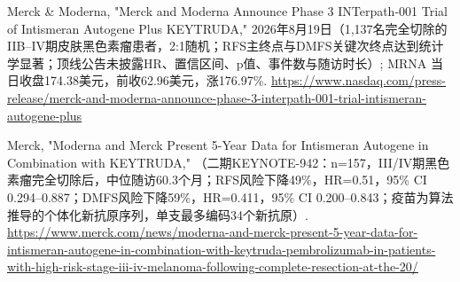 \documentclass[11pt,a4paper]{ctexart}
\begin{document}
\noindent [140] Merck \& Moderna, "Merck and Moderna Announce Phase 3 INTerpath-001 Trial of Intismeran Autogene Plus KEYTRUDA," 2026年8月19日（1,137名完全切除的IIB–IV期皮肤黑色素瘤患者，2:1随机；RFS主终点与DMFS关键次终点达到统计学显著；顶线公告未披露HR、置信区间、p值、事件数与随访时长）; MRNA 当日收盘174.38美元，前收62.96美元，涨176.97\%. \url{https://www.nasdaq.com/press-release/merck-and-moderna-announce-phase-3-interpath-001-trial-intismeran-autogene-plus}

\noindent [141] Merck, "Moderna and Merck Present 5-Year Data for Intismeran Autogene in Combination with KEYTRUDA," （二期KEYNOTE-942：n=157，III/IV期黑色素瘤完全切除后，中位随访60.3个月；RFS风险下降49\%，HR=0.51，95\% CI 0.294–0.887；DMFS风险下降59\%，HR=0.411，95\% CI 0.200–0.843；疫苗为算法推导的个体化新抗原序列，单支最多编码34个新抗原）. \url{https://www.merck.com/news/moderna-and-merck-present-5-year-data-for-intismeran-autogene-in-combination-with-keytruda-pembrolizumab-in-patients-with-high-risk-stage-iii-iv-melanoma-following-complete-resection-at-the-20/}
\end{document}

